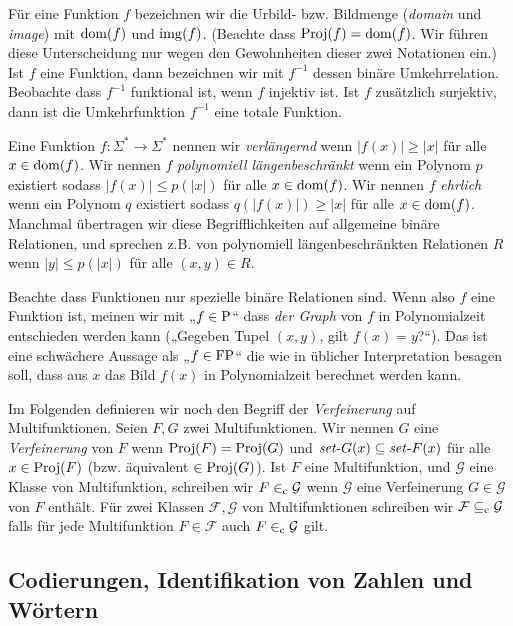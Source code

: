 Für eine Funktion $f$ bezeichnen wir die Urbild- bzw. Bildmenge (\emph{domain} und \emph{image}) mit $\dom(f)$ und $\img(f)$. (Beachte dass $\Proj(f)=\dom(f)$. Wir führen diese Unterscheidung nur wegen den Gewohnheiten dieser zwei Notationen ein.) Ist $f$ eine Funktion, dann bezeichnen wir mit $f^{-1}$ dessen binäre Umkehrrelation. Beobachte dass $f^{-1}$ funktional ist, wenn $f$ injektiv ist. Ist $f$ zusätzlich surjektiv, dann ist die Umkehrfunktion $f^{-1}$ eine totale Funktion.

Eine Funktion $f\colon\Sigma^*\to\Sigma^*$ nennen wir \emph{verlängernd} wenn $|f(x)|\geq |x|$ für alle $x\in\dom(f)$.
Wir nennen $f$ \emph{polynomiell längenbeschränkt} wenn ein Polynom $p$ existiert sodass $|f(x)|\leq p(|x|)$ für alle $x\in\dom(f)$.
Wir nennen $f$ \emph{ehrlich} wenn ein Polynom $q$ existiert sodass $q(|f(x)|)\geq |x|$ für alle $x\in\dom(f)$.
Manchmal übertragen wir diese Begrifflichkeiten auf allgemeine binäre Relationen, und sprechen z.B. von polynomiell längenbeschränkten Relationen $R$ wenn $|y|\leq p(|x|)$ für alle $(x,y)\in R$.

Beachte dass Funktionen nur spezielle binäre Relationen sind. Wenn also $f$ eine Funktion ist, meinen wir mit „$f\in\P$“ dass \emph{der Graph} von $f$ in Polynomialzeit entschieden werden kann („Gegeben Tupel $(x, y)$, gilt $f(x)=y$?“). Das ist eine schwächere Aussage als „$f\in\FP$“ die wie in üblicher Interpretation besagen soll, dass aus $x$ das Bild $f(x)$ in Polynomialzeit berechnet werden kann.

Im Folgenden definieren wir noch den Begriff der \emph{Verfeinerung} auf Multifunktionen. Seien $F, G$ zwei Multifunktionen. Wir nennen $G$ eine \emph{Verfeinerung} von $F$ wenn $\Proj(F)=\Proj(G)$ und $\fset{}G(x)\subseteq \fset{}F(x)$ für alle $x\in\Proj(F)$ (bzw. äquivalent $\in \Proj(G)$).
Ist $F$ eine Multifunktion, und $\mathcal G$ eine Klasse von Multifunktion, schreiben wir $F\inc \mathcal G$ wenn $\mathcal G$ eine Verfeinerung $G\in\mathcal G$ von $F$ enthält.
Für zwei Klassen $\mathcal F, \mathcal G$ von Multifunktionen schreiben wir $\mathcal F \subseteqc \mathcal G$ falls für jede Multifunktion $F\in\mathcal F$ auch $F\inc \mathcal G$ gilt.

\subsection*{Codierungen, Identifikation von Zahlen und Wörtern}

